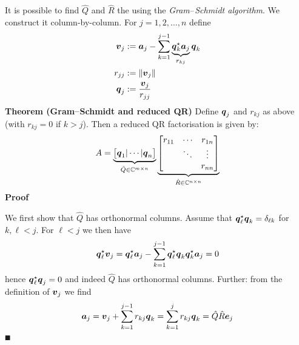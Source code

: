 It is possible to find $\hat Q$ and $\hat R$ the  using the \emph{Gram\ensuremath{\endash}Schmidt algorithm}. We construct it column-by-column. For $j = 1, 2, \ensuremath{\ldots}, n$ define
\begin{align*}
\bm{{\mbox{\boldmath$v$\unboldmath}}}_j &:= \bm{{\mbox{\boldmath$a$\unboldmath}}}_j - \sum_{k=1}^{j-1} \underbrace{\bm{{\mbox{\boldmath$q$\unboldmath}}}_k^\star \bm{{\mbox{\boldmath$a$\unboldmath}}}_j}_{r_{kj}} \bm{{\mbox{\boldmath$q$\unboldmath}}}_k \\
r_{jj} &:= {\|\bm{{\mbox{\boldmath$v$\unboldmath}}}_j\|} \\
\bm{{\mbox{\boldmath$q$\unboldmath}}}_j &:= {\bm{{\mbox{\boldmath$v$\unboldmath}}}_j \over r_{jj}}
\end{align*}
\textbf{Theorem (Gram\ensuremath{\endash}Schmidt and reduced QR)} Define $\bm{{\mbox{\boldmath$q$\unboldmath}}}_j$ and $r_{kj}$ as above (with $r_{kj} = 0$ if $k > j$). Then a reduced QR factorisation is given by:
\[
A = \underbrace{\begin{bmatrix} \ensuremath{\bm{\q}}_1 | \ensuremath{\cdots} | \ensuremath{\bm{\q}}_n \end{bmatrix}}_{ \hat Q \ensuremath{\in} \ensuremath{\bbC}^{m \ensuremath{\times} n}} \underbrace{\begin{bmatrix} r_{11} & \ensuremath{\cdots} & r_{1n} \\ & \ensuremath{\ddots} & \ensuremath{\vdots} \\ && r_{nn}  \end{bmatrix}}_{\hat R \ensuremath{\in} \ensuremath{\bbC}^{n \ensuremath{\times} n}}
\]
\textbf{Proof}

We first show that $\hat Q$ has orthonormal columns. Assume that $\bm{{\mbox{\boldmath$q$\unboldmath}}}_\ell^\star \bm{{\mbox{\boldmath$q$\unboldmath}}}_k = \delta_{\ell k}$ for $k,\ensuremath{\ell} < j$.  For $\ensuremath{\ell} < j$ we then have
\[
\bm{{\mbox{\boldmath$q$\unboldmath}}}_\ell^\star \bm{{\mbox{\boldmath$v$\unboldmath}}}_j = \bm{{\mbox{\boldmath$q$\unboldmath}}}_\ell^\star \bm{{\mbox{\boldmath$a$\unboldmath}}}_j - \sum_{k=1}^{j-1}  \bm{{\mbox{\boldmath$q$\unboldmath}}}_\ell^\star\bm{{\mbox{\boldmath$q$\unboldmath}}}_k \bm{{\mbox{\boldmath$q$\unboldmath}}}_k^\star \bm{{\mbox{\boldmath$a$\unboldmath}}}_j = 0
\]
hence $\bm{{\mbox{\boldmath$q$\unboldmath}}}_\ell^\star \bm{{\mbox{\boldmath$q$\unboldmath}}}_j = 0$ and indeed $\hat Q$ has orthonormal columns. Further: from the definition of $\bm{{\mbox{\boldmath$v$\unboldmath}}}_j$ we find
\[
\bm{{\mbox{\boldmath$a$\unboldmath}}}_j = \bm{{\mbox{\boldmath$v$\unboldmath}}}_j + \sum_{k=1}^{j-1} r_{kj} \bm{{\mbox{\boldmath$q$\unboldmath}}}_k = \sum_{k=1}^j r_{kj} \bm{{\mbox{\boldmath$q$\unboldmath}}}_k  = \hat Q \hat R \bm{{\mbox{\boldmath$e$\unboldmath}}}_j
\]
\ensuremath{\QED}

